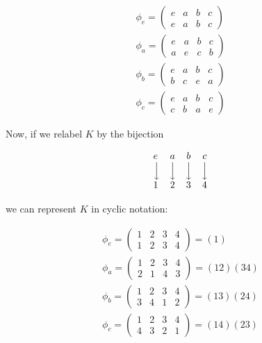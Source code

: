 \documentclass{article}
\theoremstyle{definition}
\DeclareMathOperator{\bda}{\Big \downarrow}						%
\begin{document}
\bigskip
\begin{equation*}
\begin{array}{llll}
\phi_{e} = \begin{pmatrix} e & a & b & c \\ e & a & b & c \end{pmatrix}  \\
\phi_{a} = \begin{pmatrix} e & a & b & c \\ a & e & c & b \end{pmatrix}  \\
\phi_{b} = \begin{pmatrix} e & a & b & c \\ b & c & e & a \end{pmatrix}  \\
\phi_{c} = \begin{pmatrix} e & a & b & c \\ c & b & a & e \end{pmatrix}                                   
\end{array}
\end{equation*}

\bigskip
\noindent
Now, if we relabel $K$ by the bijection

\begin{equation*}
\begin{array}{l c c c c c c c c c c c c}
 e      & a     & b     & c \\
 \bda   & \bda  & \bda  & \bda \\
 1      & 2     & 3     & 4
\end{array}
\end{equation*}

\bigskip
\noindent
we can represent $K$ in cyclic notation:

\bigskip
\begin{equation*}
\begin{array}{llll}
\phi_{e} = \begin{pmatrix} 1 & 2 & 3 & 4  \\ 1 & 2 & 3 & 4  \end{pmatrix}  = (1) \\
\phi_{a} = \begin{pmatrix} 1 & 2 & 3 & 4  \\ 2 & 1 & 4 & 3 \end{pmatrix}   = (12)(34) \\
\phi_{b} = \begin{pmatrix} 1 & 2 & 3 & 4  \\  3 & 4 & 1 & 2 \end{pmatrix}  = (13)(24) \\
\phi_{c} = \begin{pmatrix} 1 & 2 & 3 & 4  \\  4 & 3 & 2 & 1 \end{pmatrix}   = (14)(23)                                 
\end{array} 
\end{equation*}
\end{document}
